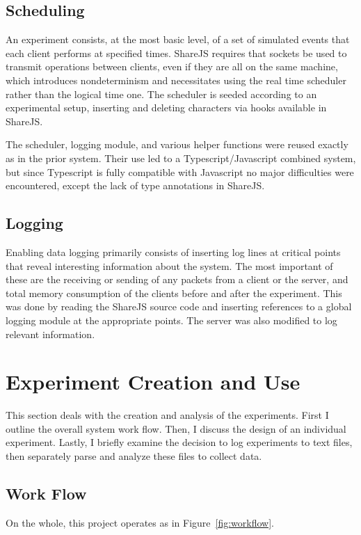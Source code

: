 \documentclass[12pt,a4paper,twoside,openright]{report}
\begin{document}
	\subsection{Scheduling}
	An experiment consists, at the most basic level, of a set of simulated events that each client performs at specified times. ShareJS requires that sockets be used to transmit operations between clients, even if they are all on the same machine, which introduces nondeterminism and necessitates using the real time scheduler rather than the logical time one. The scheduler is seeded according to an experimental setup, inserting and deleting characters via hooks available in ShareJS.
	
	The scheduler, logging module, and various helper functions were reused exactly as in the prior system. Their use led to a Typescript/Javascript combined system, but since Typescript is fully compatible with Javascript no major difficulties were encountered, except the lack of type annotations in ShareJS.
	
	\subsection{Logging}
	Enabling data logging primarily consists of inserting log lines at critical points that reveal interesting information about the system. The most important of these are the receiving or sending of any packets from a client or the server, and total memory consumption of the clients before and after the experiment. This was done by reading the ShareJS source code and inserting references to a global logging module at the appropriate points. The server was also modified to log relevant information.
	
\section{Experiment Creation and Use} \label{sec:experimentcreation}

	This section deals with the creation and analysis of the experiments. First I outline the overall system work flow. Then, I discuss the design of an individual experiment. Lastly, I briefly examine the decision to log experiments to text files, then separately parse and analyze these files to collect data.

	\subsection{Work Flow}
	On the whole, this project operates as in Figure~\ref{fig:workflow}. 
	
\end{document}
